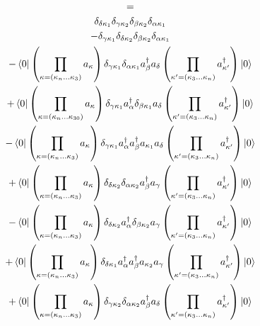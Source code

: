 \documentclass[12pt]{article}
\begin{document}
\begin{multline}
    =\\
    \delta_{\delta\kappa_{1}}\delta_{\gamma\kappa_{2}}\delta_{\beta\kappa_{2}}\delta_{\alpha\kappa_{1}}\\
    -\delta_{\gamma\kappa_{1}}\delta_{\delta\kappa_{2}}\delta_{\beta\kappa_{2}}\delta_{\alpha\kappa_{1}}\\
    -\bra{0}\left(\prod_{\kappa=\left(\kappa_{n}\dots\kappa_{3}\right)}a_{\kappa}\right)
        \delta_{\gamma\kappa_{1}}\delta_{\alpha\kappa_{1}}a^{\dag}_{\beta}a_{\delta}
    \left(\prod_{\kappa^{\prime}=\left(\kappa_{3}\dots\kappa_{n}\right)}a^{\dag}_{\kappa^{\prime}}\right)\ket{0}\\
    +\bra{0}\left(\prod_{\kappa=\left(\kappa_{n}\dots\kappa_{30}\right)}a_{\kappa}\right)
        \delta_{\gamma\kappa_{1}}a^{\dag}_{\alpha}\delta_{\beta\kappa_{1}}a_{\delta}
    \left(\prod_{\kappa^{\prime}=\left(\kappa_{3}\dots\kappa_{n}\right)}a^{\dag}_{\kappa^{\prime}}\right)\ket{0}\\
    -\bra{0}\left(\prod_{\kappa=\left(\kappa_{n}\dots\kappa_{3}\right)}a_{\kappa}\right)
        \delta_{\gamma\kappa_{1}}a^{\dag}_{\alpha}a^{\dag}_{\beta}a_{\kappa_{1}}a_{\delta}
    \left(\prod_{\kappa^{\prime}=\left(\kappa_{3}\dots\kappa_{n}\right)}a^{\dag}_{\kappa^{\prime}}\right)\ket{0}\\
    +\bra{0}\left(\prod_{\kappa=\left(\kappa_{n}\dots\kappa_{3}\right)}a_{\kappa}\right)
        \delta_{\delta\kappa_{2}}\delta_{\alpha\kappa_{2}}a^{\dag}_{\beta}a_{\gamma}
    \left(\prod_{\kappa^{\prime}=\left(\kappa_{3}\dots\kappa_{n}\right)}a^{\dag}_{\kappa^{\prime}}\right)\ket{0}\\
    -\bra{0}\left(\prod_{\kappa=\left(\kappa_{n}\dots\kappa_{3}\right)}a_{\kappa}\right)
        \delta_{\delta\kappa_{2}}a^{\dag}_{\alpha}\delta_{\beta\kappa_{2}}a_{\gamma}
    \left(\prod_{\kappa^{\prime}=\left(\kappa_{3}\dots\kappa_{n}\right)}a^{\dag}_{\kappa^{\prime}}\right)\ket{0}\\
    +\bra{0}\left(\prod_{\kappa=\left(\kappa_{n}\dots\kappa_{3}\right)}a_{\kappa}\right)
        \delta_{\delta\kappa_{1}}a^{\dag}_{\alpha}a^{\dag}_{\beta}a_{\kappa_{2}}a_{\gamma}
    \left(\prod_{\kappa^{\prime}=\left(\kappa_{3}\dots\kappa_{n}\right)}a^{\dag}_{\kappa^{\prime}}\right)\ket{0}\\
    +\bra{0}\left(\prod_{\kappa=\left(\kappa_{n}\dots\kappa_{3}\right)}a_{\kappa}\right)
        \delta_{\gamma\kappa_{2}}\delta_{\alpha\kappa_{2}}a^{\dag}_{\beta}a_{\delta}    
    \left(\prod_{\kappa^{\prime}=\left(\kappa_{3}\dots\kappa_{n}\right)}a^{\dag}_{\kappa^{\prime}}\right)\ket{0}\\

\end{multline}
\end{document}
